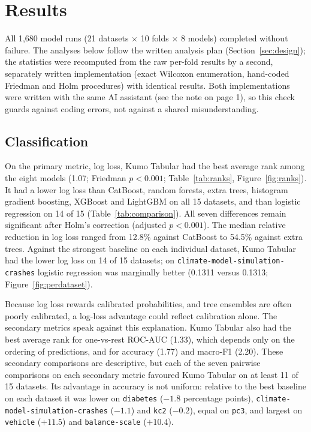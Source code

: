 \section{Results}
\label{sec:results}

All 1{,}680 model runs (21 datasets $\times$ 10 folds $\times$ 8 models) completed without failure. The analyses below
follow the written analysis plan (Section~\ref{sec:design}); the statistics were recomputed from the raw per-fold results by a second, separately written
implementation (exact Wilcoxon enumeration, hand-coded Friedman and Holm procedures) with identical results. Both
implementations were written with the same AI assistant (see the note on page 1), so this check guards against
coding errors, not against a shared misunderstanding.

\subsection{Classification}
On the primary metric, log loss, Kumo Tabular had the best average rank among the eight models (1.07; Friedman
$p<0.001$; Table~\ref{tab:ranks}, Figure~\ref{fig:ranks}). It had a lower log loss than CatBoost, random forests,
extra trees, histogram gradient boosting, XGBoost and LightGBM on all 15 datasets, and than logistic regression on 14 of
15 (Table~\ref{tab:comparison}). All seven differences remain significant after Holm's correction (adjusted $p<0.001$).
The median relative reduction in log loss ranged from 12.8\% against CatBoost to 54.5\% against extra trees. Against the
strongest baseline on each individual dataset, Kumo Tabular had the lower log loss on 14 of 15 datasets; on
\texttt{climate-model-simulation-crashes} logistic regression was marginally better (0.1311 versus 0.1313;
Figure~\ref{fig:perdataset}).

Because log loss rewards calibrated probabilities, and tree ensembles are often poorly calibrated, a log-loss advantage
could reflect calibration alone. The secondary metrics speak against this explanation. Kumo Tabular also had the best
average rank for one-vs-rest ROC-AUC (1.33), which depends only on the ordering of predictions, and for accuracy (1.77)
and macro-F1 (2.20). These secondary comparisons are descriptive, but each of the seven pairwise comparisons on each
secondary metric favoured Kumo Tabular on at least 11 of 15 datasets. Its advantage in accuracy is not uniform: relative
to the best baseline on each dataset it was lower on \texttt{diabetes} ($-1.8$ percentage points),
\texttt{climate-model-simulation-crashes} ($-1.1$) and \texttt{kc2} ($-0.2$), equal on \texttt{pc3}, and largest on
\texttt{vehicle} ($+11.5$) and \texttt{balance-scale} ($+10.4$).

